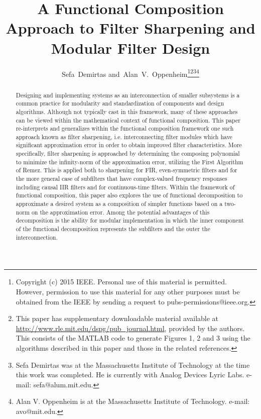 \documentclass[journal] {IEEEtran}
\begin{document}
\title{ A Functional Composition Approach to Filter Sharpening and Modular Filter Design}


\author{Sefa~Demirtas
        and~Alan~V.~Oppenheim\thanks{Copyright (c) 2015 IEEE. Personal use of this material is permitted. However, permission to use this material for any other purposes must be obtained from the IEEE by sending a request to pubs-permissions@ieee.org.}\thanks{This paper has supplementary downloadable material available at \url{http://www.rle.mit.edu/dspg/pub_journal.html}, provided by the authors. This consists of the MATLAB code to generate Figures 1, 2 and 3 using the algorithms described in this paper and those in the related references. }\thanks{Sefa Demirtas was at the Massachusetts Institute of Technology at the time this work was completed. He is currently with Analog Devices Lyric Labs. e-mail: sefa@alum.mit.edu.}\thanks{Alan V. Oppenheim is at the Massachusetts Institute of Technology. e-mail: avo@mit.edu.}}



















\maketitle

\begin{abstract}
Designing and implementing systems as an interconnection of smaller subsystems is a common practice for modularity and standardization of components and design algorithms. Although not typically cast in this framework, many of these approaches can be viewed within the mathematical context of functional composition. This paper re-interprets and generalizes within the functional composition framework one such approach known as filter sharpening, i.e. interconnecting  filter modules which have significant approximation error in order to obtain improved filter characteristics. More specifically, filter sharpening is approached by determining the composing polynomial to minimize the infinity-norm of the  approximation error, utilizing the First Algorithm of Remez. This is applied both to sharpening for FIR, even-symmetric filters and for the more general case of subfilters that have complex-valued frequency responses including causal IIR filters and for continuous-time filters. Within the framework of functional composition, this paper also explores the use of functional decomposition to approximate a desired system as a composition of simpler functions based on a two-norm on the approximation error. Among the potential advantages of this decomposition is the ability for modular implementation  in which the inner component of the functional decomposition represents the subfilters and the outer the interconnection.
\end{abstract}
\end{document}
